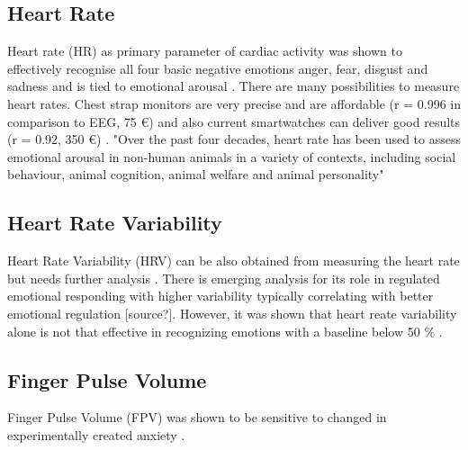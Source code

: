 \subsection{Heart Rate}
Heart rate (HR) as primary parameter of cardiac activity was shown to effectively recognise all four basic negative emotions anger, fear, disgust and sadness \cite{levenson2003blood} and is tied to emotional arousal \cite{nacke2015physiological}. There are many possibilities to measure heart rates. Chest strap monitors are very precise and are affordable (r = 0.996 in comparison to EEG, 75 €) \cite{link_herzfrequenzsensor} and also current smartwatches can deliver good results (r = 0.92, 350 €) \cite{gillinov2017variable}.
"Over the past four decades, heart rate has been used to assess emotional arousal in non-human animals in a variety of contexts, including social behaviour, animal cognition, animal welfare and animal personality" \cite{wascher2021heart}

\subsection{Heart Rate Variability}
Heart Rate Variability (HRV) can be also obtained from measuring the heart rate but needs further analysis \cite{nacke2015physiological}. There is emerging analysis for its role in regulated emotional responding \cite{appelhans2006heat} with higher variability typically correlating with better emotional regulation [source?]. However, it was shown that heart reate variability alone is not that effective in recognizing emotions with a baseline below 50 \% \cite{ferdinando2014emotion}.


\subsection{Finger Pulse Volume}
Finger Pulse Volume (FPV) was shown to be sensitive to changed in experimentally created anxiety \cite{bloom77finger}.

